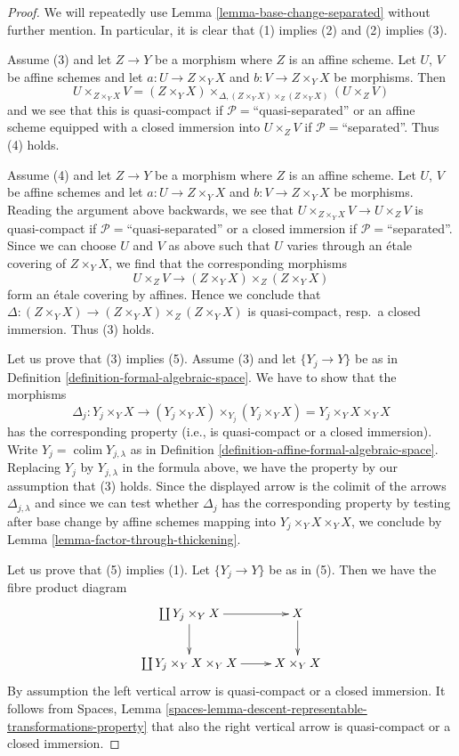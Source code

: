 \documentclass{stacks-project}
\theoremstyle{plain}
\theoremstyle{definition}
\theoremstyle{remark}
\numberwithin{equation}{subsection}
\def\colim{\mathop{\mathrm{colim}}\nolimits}
\begin{document}
\begin{proof}
We will repeatedly use
Lemma \ref{lemma-base-change-separated}
without further mention. In particular, it is clear that
(1) implies (2) and (2) implies (3).

\medskip\noindent
Assume (3) and let $Z \to Y$ be a morphism where $Z$ is an affine scheme.
Let $U$, $V$ be affine schemes and let $a : U \to Z \times_Y X$
and $b : V \to Z \times_Y X$ be morphisms. Then
$$
U \times_{Z \times_Y X} V =
(Z \times_Y X) \times_{\Delta, (Z \times_Y X) \times_Z (Z \times_Y X)}
(U \times_Z V)
$$
and we see that this is quasi-compact if $\mathcal{P} =$``quasi-separated''
or an affine scheme equipped with a closed immersion into
$U \times_Z V$ if $\mathcal{P} =$``separated''. Thus (4) holds.

\medskip\noindent
Assume (4) and let $Z \to Y$ be a morphism where $Z$ is an affine scheme.
Let $U$, $V$ be affine schemes and let $a : U \to Z \times_Y X$
and $b : V \to Z \times_Y X$ be morphisms. Reading the argument above
backwards, we see that $U \times_{Z \times_Y X} V \to U \times_Z V$
is quasi-compact if $\mathcal{P} =$``quasi-separated'' or a closed
immersion if $\mathcal{P} =$``separated''. Since we can choose $U$ and
$V$ as above such that $U$ varies through an
\'etale covering of $Z \times_Y X$, we find
that the corresponding morphisms
$$
U \times_Z V \to (Z \times_Y X) \times_Z (Z \times_Y X)
$$
form an \'etale covering by affines. Hence we conclude that
$\Delta : (Z \times_Y X) \to (Z \times_Y X) \times_Z (Z \times_Y X)$
is quasi-compact, resp.\ a closed immersion. Thus (3) holds.

\medskip\noindent
Let us prove that (3) implies (5). Assume (3) and let
$\{Y_j \to Y\}$ be as in
Definition \ref{definition-formal-algebraic-space}.
We have to show that the morphisms
$$
\Delta_j :
Y_j \times_Y X
\longrightarrow
(Y_j \times_Y X) \times_{Y_j} (Y_j \times_Y X) =
Y_j \times_Y X \times_Y X
$$
has the corresponding property (i.e., is quasi-compact or a closed immersion).
Write $Y_j = \colim Y_{j, \lambda}$ as in
Definition \ref{definition-affine-formal-algebraic-space}.
Replacing $Y_j$ by $Y_{j, \lambda}$ in the formula above, we have the
property by our assumption that (3) holds. Since the displayed arrow
is the colimit of the arrows $\Delta_{j, \lambda}$ and since we
can test whether $\Delta_j$ has the corresponding property by
testing after base change by affine schemes mapping into
$Y_j \times_Y X \times_Y X$, we conclude by
Lemma \ref{lemma-factor-through-thickening}.

\medskip\noindent
Let us prove that (5) implies (1). Let $\{Y_j \to Y\}$ be as in (5).
Then we have the fibre product diagram
$$
\xymatrix{
\coprod Y_j \times_Y X \ar[r] \ar[d] &
X \ar[d] \\
\coprod Y_j \times_Y X \times_Y X \ar[r] &
X \times_Y X
}
$$
By assumption the left vertical arrow is quasi-compact or a closed immersion.
It follows from
Spaces, Lemma \ref{spaces-lemma-descent-representable-transformations-property}
that also the right vertical arrow is quasi-compact or a
closed immersion.
\end{proof}
\end{document}
